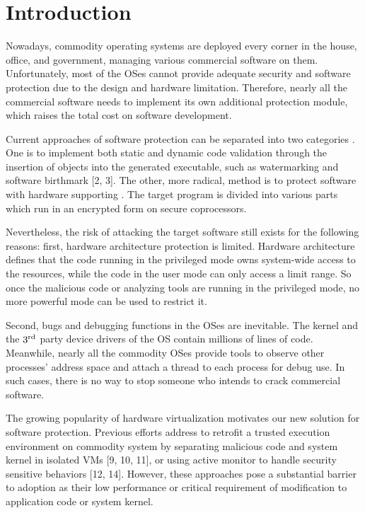 \documentclass[conference]{IEEEtran}
\begin{document}
\IEEEpeerreviewmaketitle

\bigskip

\section{Introduction}


Nowadays, commodity operating systems are deployed every corner in
the house, office, and government, managing various commercial
software on them. Unfortunately, most of the OSes cannot provide
adequate security and software protection due to the design and
hardware limitation. Therefore, nearly all the commercial software
needs to implement its own additional protection module, which
raises the total cost on software development.

Current approaches of software protection can be separated into two
categories \cite{IEEEhowto:1}. One is to implement both static and
dynamic code validation through the insertion of objects into the
generated executable, such as watermarking and software birthmark
[2, 3]. The other, more radical, method is to protect software with
hardware supporting \cite{IEEEhowto:20}. The target program is
divided into various parts which run in an encrypted form on secure
coprocessors.

Nevertheless, the risk of attacking the target software still exists
for the following reasons: first, hardware architecture protection
is limited. Hardware architecture defines that the code running in
the privileged mode owns system-wide access to the resources, while
the code in the user mode can only access a limit
range\cite{IEEEhowto:21}. So once the malicious code or analyzing
tools are running in the privileged mode, no more powerful mode can
be used to restrict it.

Second, bugs and debugging functions in the OSes are inevitable. The
kernel and the $\text3^\text{rd}$ party device drivers of the OS
contain millions of lines of code\cite{IEEEhowto:7}. Meanwhile,
nearly all the commodity OSes provide tools to observe other
processes' address space and attach a thread to each process for
debug use. In such cases, there is no way to stop someone who
intends to crack commercial software.

The growing popularity of hardware virtualization motivates our
new solution for software protection. Previous efforts address to
retrofit a trusted execution environment on commodity system by
separating malicious code and system kernel in isolated VMs [9,
10, 11], or using active monitor to handle security sensitive
behaviors [12, 14]. However, these approaches pose a substantial
barrier to adoption as their low performance or critical
requirement of modification to application code or system kernel.
\end{document}
